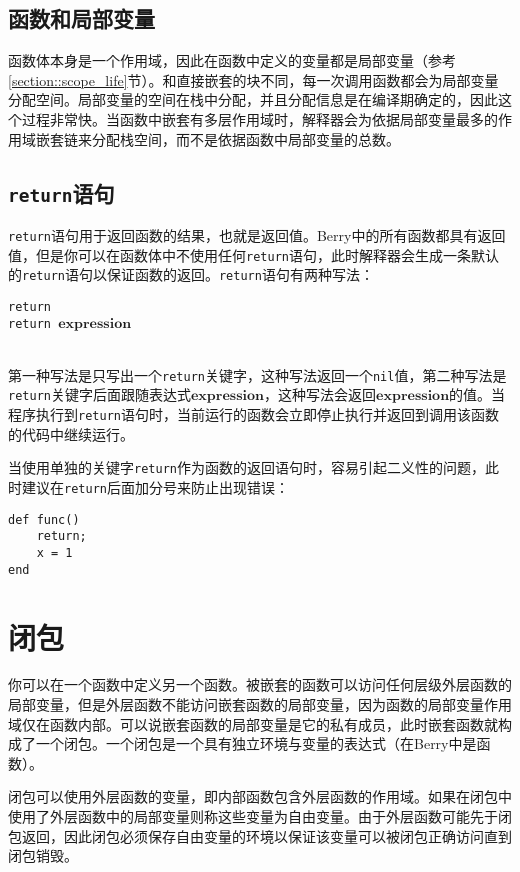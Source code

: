 \subsection{函数和局部变量}

函数体本身是一个作用域，因此在函数中定义的变量都是局部变量（参考\ref{section::scope_life}节）。和直接嵌套的块不同，每一次调用函数都会为局部变量分配空间。局部变量的空间在栈中分配，并且分配信息是在编译期确定的，因此这个过程非常快。当函数中嵌套有多层作用域时，解释器会为依据局部变量最多的作用域嵌套链来分配栈空间，而不是依据函数中局部变量的总数。

\subsection{\texttt{return}语句}

\texttt{return}语句用于返回函数的结果，也就是返回值。Berry中的所有函数都具有返回值，但是你可以在函数体中不使用任何\texttt{return}语句，此时解释器会生成一条默认的\texttt{return}语句以保证函数的返回。\texttt{return}语句有两种写法：
\begin{algorithm}
    \texttt{return} \\
    \texttt{return }$\bm{expression}$
\end{algorithm}\vspace{-0.6em}\\
第一种写法是只写出一个\texttt{return}关键字，这种写法返回一个\texttt{nil}值，第二种写法是\texttt{return}关键字后面跟随表达式$\bm{expression}$，这种写法会返回$\bm{expression}$的值。当程序执行到\texttt{return}语句时，当前运行的函数会立即停止执行并返回到调用该函数的代码中继续运行。

当使用单独的关键字\texttt{return}作为函数的返回语句时，容易引起二义性的问题，此时建议在\texttt{return}后面加分号来防止出现错误：
\begin{lstlisting}[language=berry, numbers=none]
def func()
    return;
    x = 1
end
\end{lstlisting}

\section{闭包}

你可以在一个函数中定义另一个函数。被嵌套的函数可以访问任何层级外层函数的局部变量，但是外层函数不能访问嵌套函数的局部变量，因为函数的局部变量作用域仅在函数内部。可以说嵌套函数的局部变量是它的私有成员，此时嵌套函数就构成了一个闭包。一个闭包是一个具有独立环境与变量的表达式（在Berry中是函数）。

闭包可以使用外层函数的变量，即内部函数包含外层函数的作用域。如果在闭包中使用了外层函数中的局部变量则称这些变量为自由变量。由于外层函数可能先于闭包返回，因此闭包必须保存自由变量的环境以保证该变量可以被闭包正确访问直到闭包销毁。
